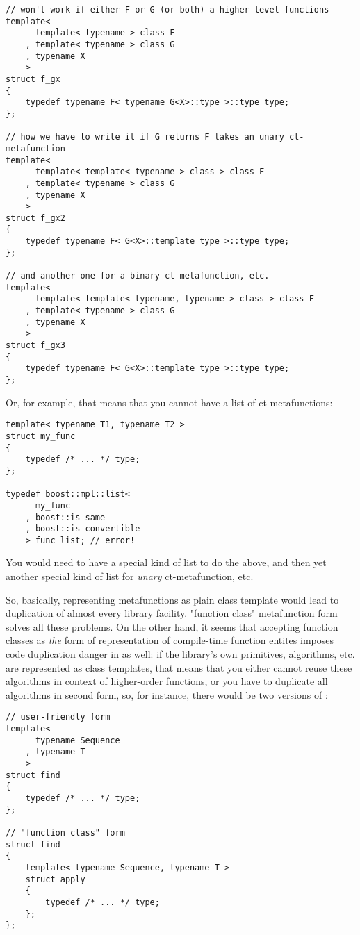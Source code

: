 \documentclass{netobjectdays}
\begin{document}
{\footnotesize
\begin{verbatim}
// won't work if either F or G (or both) a higher-level functions
template<
      template< typename > class F
    , template< typename > class G
    , typename X
    >
struct f_gx
{
    typedef typename F< typename G<X>::type >::type type;
};

// how we have to write it if G returns F takes an unary ct-metafunction
template<
      template< template< typename > class > class F
    , template< typename > class G
    , typename X
    >
struct f_gx2
{
    typedef typename F< G<X>::template type >::type type;
};

// and another one for a binary ct-metafunction, etc.
template<
      template< template< typename, typename > class > class F
    , template< typename > class G
    , typename X
    >
struct f_gx3
{
    typedef typename F< G<X>::template type >::type type;
};
\end{verbatim}
}

Or, for example, that means that you cannot have a list of 
ct-metafunctions:

{\footnotesize
\begin{verbatim}
template< typename T1, typename T2 >
struct my_func
{
    typedef /* ... */ type;
};

typedef boost::mpl::list< 
      my_func
    , boost::is_same
    , boost::is_convertible
    > func_list; // error!
\end{verbatim}
}

You would need to have a special kind of list to do the above, 
and then yet another special kind of list for \emph{unary} 
ct-metafunction, etc.

So, basically, representing metafunctions as plain class 
template would lead to duplication of almost every library 
facility. "function class" metafunction form solves all these 
problems. On the other hand, it seems that accepting function 
classes as \emph{the} form of representation of compile-time 
function entites imposes code duplication danger in as well: 
if the library's own primitives, algorithms, etc. are 
represented as class templates, that means that you either 
cannot reuse these algorithms in context of higher-order 
functions, or you have to duplicate all algorithms in second 
form, so, for instance, there would be two versions of 
:

{\footnotesize
\begin{verbatim}
// user-friendly form
template<
      typename Sequence
    , typename T
    >
struct find
{
    typedef /* ... */ type;
};

// "function class" form
struct find
{
    template< typename Sequence, typename T >
    struct apply
    {
        typedef /* ... */ type;
    };
};
\end{verbatim}
}
\end{document}
